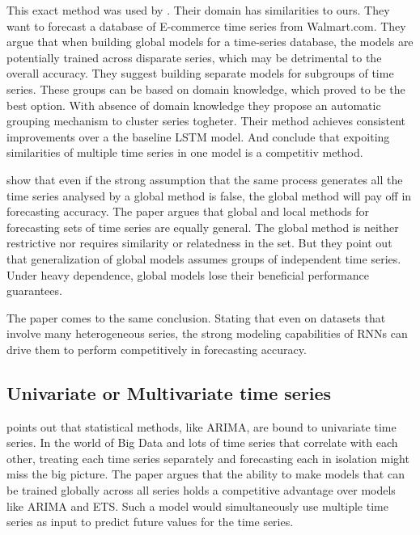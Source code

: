 This exact method was used by \cite{Bandara2017}.
Their domain has similarities to ours. They want to forecast a database of E-commerce time series
from Walmart.com.
They argue that when building global models for a time-series database, the models are 
potentially trained across disparate series, which may be detrimental to the overall accuracy.
They suggest building separate models for subgroups of time series.
These groups can be based on domain knowledge, which proved to be the best option. With absence of 
domain knowledge they propose an automatic grouping mechanism to cluster series togheter.
Their method achieves consistent improvements over a the baseline LSTM model.
And conclude that expoiting similarities of multiple time series in one model is a competitiv method.




\cite{Rabanser2020} show that even if the strong assumption that the same process generates all the time series analysed by a global
method is false, the global method will pay off in forecasting accuracy.
The paper argues that global and local methods for forecasting
sets of time series are equally general. The global method is neither restrictive nor requires
similarity or relatedness in the set.
But they point out that generalization of global models assumes groups of independent time series.
Under heavy dependence, global models lose their beneficial performance guarantees. 

The paper \cite{Hewamalage2021} comes to the same conclusion. Stating that 
even on datasets that involve many heterogeneous series, the strong modeling capabilities of RNNs can drive
them to perform competitively in forecasting accuracy.

\subsection{Univariate or Multivariate time series}
\cite{Bandara2017} points out that statistical methods, like ARIMA, are bound to
univariate time series. In the world of Big Data and lots of time series that correlate with each other,
treating each time series separately and forecasting each in isolation might miss the big picture.
The paper argues that the ability to make models that can be trained globally across all series
holds a competitive advantage over models like ARIMA and ETS.
Such a model would simultaneously use multiple time series as input to predict future values for the time series.

